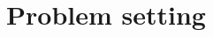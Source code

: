 \documentclass[colorbacktitle,inverttitle,landscape,presentation,
	english,
	aspectratio=43, %
	accentcolor=tud9b, %
]{tudbeamer}
\begin{document}
\section{Problem setting}
%	


\end{document}
